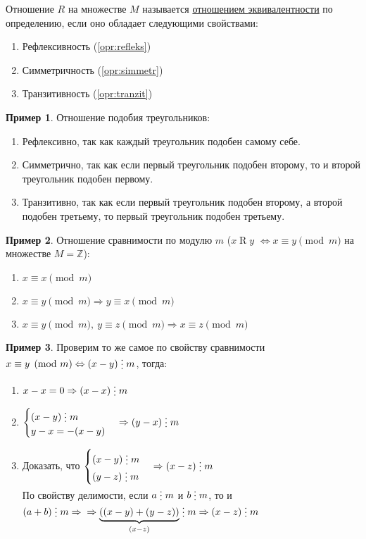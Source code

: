 \documentclass[russian]{lecture-notes}
\theoremstyle{definition}
\newtheorem{example*}{Пример}[subsection]
\newcommand{\R}[2]{$#1\mathrel{R}#2$}
\newcommand{\divs}{\mathrel{\raisebox{-2pt}{\vdots}}}
\begin{document}
\begin{definition}
	\label{opr:otnosh}
	Отношение $R$ на множестве $M$ называется \underline{отношением } \underline{эквивалентности} по определению, если оно обладает следующими свойствами:
	\begin{enumerate}
		\item Рефлексивность (\ref{opr:refleks})
		\item Симметричность (\ref{opr:simmetr})
		\item Транзитивность (\ref{opr:tranzit})
	\end{enumerate}
\end{definition}

\begin{example*}
	Отношение подобия треугольников:
	\begin{enumerate}
		\item Рефлексивно, так как каждый треугольник подобен самому себе.
		\item Симметрично, так как если первый треугольник подобен второму, то и второй треугольник подобен первому.
		\item Транзитивно, так как если первый треугольник подобен второму, а второй подобен третьему, то первый треугольник подобен третьему.
	\end{enumerate}
\end{example*}
	
\begin{example*}
		Отношение сравнимости по модулю $m$ (\R{x}{y} $\Leftrightarrow x \equiv y \pmod m$ на множестве $M = \mathbb{Z}$):
		\begin{enumerate}
			\item $x\equiv x \pmod m$
			\item $x\equiv y \pmod m \Rightarrow y\equiv x \pmod m$
			\item $x\equiv y \pmod m, \ y\equiv z \pmod m \Rightarrow x\equiv z \pmod m$
		\end{enumerate}
\end{example*}

\begin{example*}
		Проверим то же самое по свойству сравнимости $x \equiv y \pmod m \Leftrightarrow (x-y) \divs m$, тогда:
		\begin{enumerate}
			\item $x-x=0 \Rightarrow (x-x) \divs m$
			\item $\begin{cases}
					(x-y) \divs m
					\\
					y-x=-(x-y)
					\end{cases}
					\Rightarrow (y-x) \divs m$
			\item Доказать, что $\begin{cases}
					(x-y) \divs m
					\\
					(y-z) \divs m
					\end{cases}
					\Rightarrow (x-z) \divs m$\\
					По свойству делимости, если $a \divs m$ и $b \divs m$, то и $(a+b) \divs m \Rightarrow \\ \Rightarrow \underbrace{((x-y)+(y-z))}_{(x-z)} \divs m \Rightarrow (x-z) \divs m$
		\end{enumerate}
\end{example*}
\end{document}

